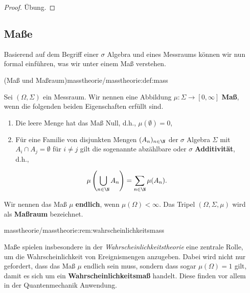 \documentclass[letterpaper,10pt,german]{jupyterBook}
\begin{document}
\begin{proof}
 Übung.
\end{proof}


\subsection{Maße}
\label{\detokenize{masstheorie/masstheorie:masze}}
\par
Basierend auf dem Begriff einer \(\sigma\) Algebra und eines Messraums können wir nun formal einführen, was wir unter einem Maß verstehen.
\begin{definition}{(Maß und Maßraum)}{masstheorie/masstheorie:def:mass}



\par
Sei \((\Omega, \Sigma)\) ein Messraum.
Wir nennen eine Abbildung \(\mu: \Sigma\to [0, \infty]\) \textbf{Maß}, wenn die folgenden beiden Eigenschaften erfüllt sind.
\begin{enumerate}

\item {} 
\par
Die leere Menge hat das Maß Null, d.h., \(\mu(\emptyset) = 0\),

\item {} 
\par
Für eine Familie von disjunkten Mengen \((A_n)_{n\in\N}\) der \(\sigma\) Algebra \(\Sigma\) mit \(A_i \cap A_j = \emptyset\) für \(i \neq j\) gilt die sogenannte abzählbare oder \(\sigma\) \textbf{Additivität}, d.h.,

\end{enumerate}
\begin{align*}
\mu\left( \bigcup_{n\in\N}A_n \right) = \sum_{n\in\N}\mu (A_n).
\end{align*}
\par
Wir nennen das Maß \(\mu\) \textbf{endlich}, wenn \(\mu(\Omega)<\infty\).
Das Tripel \((\Omega, \Sigma, \mu)\) wird als \textbf{Maßraum} bezeichnet.
\end{definition}
\begin{remark}{}{masstheorie/masstheorie:rem:wahrscheinlichkeitsmass}



\par
Maße spielen insbesondere in der \emph{Wahrscheinlichkeitstheorie} eine zentrale Rolle, um die Wahrscheinlichkeit von Ereignismengen anzugeben.
Dabei wird nicht nur gefordert, dass das Maß \(\mu\) endlich sein muss, sondern dass sogar \(\mu(\Omega)=1\) gilt, damit es sich um ein \textbf{Wahrscheinlichkeitsmaß} handelt.
Diese finden vor allem in der Quantenmechanik Anwendung.
\end{remark}
\end{document}

